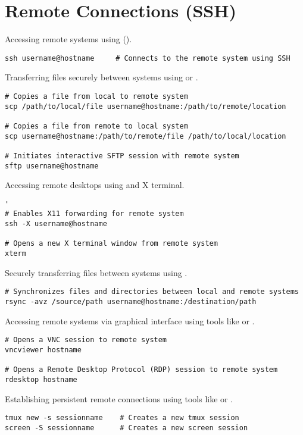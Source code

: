 \section{Remote Connections (SSH)}


Accessing remote systems using  ().
\begin{lstlisting}
ssh username@hostname     # Connects to the remote system using SSH
\end{lstlisting}

Transferring files securely between systems using  or .
\begin{lstlisting}
# Copies a file from local to remote system
scp /path/to/local/file username@hostname:/path/to/remote/location

# Copies a file from remote to local system
scp username@hostname:/path/to/remote/file /path/to/local/location

# Initiates interactive SFTP session with remote system
sftp username@hostname    
\end{lstlisting}

Accessing remote desktops using  and X terminal.
\begin{lstlisting}'
# Enables X11 forwarding for remote system
ssh -X username@hostname

# Opens a new X terminal window from remote system
xterm        
\end{lstlisting}

Securely transferring files between systems using .
\begin{lstlisting}
# Synchronizes files and directories between local and remote systems
rsync -avz /source/path username@hostname:/destination/path
\end{lstlisting}

Accessing remote systems via graphical interface using tools like  or .
\begin{lstlisting}
# Opens a VNC session to remote system
vncviewer hostname

# Opens a Remote Desktop Protocol (RDP) session to remote system
rdesktop hostname
\end{lstlisting}

Establishing persistent remote connections using tools like  or .
\begin{lstlisting}
tmux new -s sessionname    # Creates a new tmux session
screen -S sessionname      # Creates a new screen session
\end{lstlisting}








